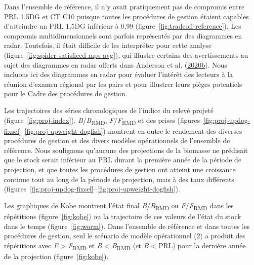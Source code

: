 \documentclass[11pt]{book}
\begin{document}
Dans l'ensemble de référence, il n'y avait pratiquement pas de compromis entre PRL 1,5DG et CT C10 puisque toutes les procédures de gestion étaient capables d'atteindre un PRL 1,5DG inférieur à 0,99 (figure~\ref{fig:tradeoff-reference}). Les compromis multidimensionnels sont parfois représentés par des diagrammes en radar. Toutefois, il était difficile de les interpréter pour cette analyse (figure~\ref{fig:spider-satisficed-mps-avg}), qui illustre certains des avertissements au sujet des diagrammes en radar offerts dans Anderson et al. (\protect\hyperlink{ref-anderson2020gfmp}{2020}\protect\hyperlink{ref-anderson2020gfmp}{b}). Nous incluons ici des diagrammes en radar pour évaluer l'intérêt des lecteurs à la réunion d'examen régional par les pairs et pour illustrer leurs pièges potentiels pour le Cadre des procédures de gestion.

Les trajectoires des séries chronologiques de l'indice du relevé projeté (figure~\ref{fig:proj-index}), \emph{B}/\emph{B}\textsubscript{RMD}, \emph{F}/\emph{F}\textsubscript{RMD} et des prises (figures~\ref{fig:proj-updog-fixsel}--\ref{fig:proj-upweight-dogfish}) montrent en outre le rendement des diverses procédures de gestion et des divers modèles opérationnels de l'ensemble de référence. Nous soulignons qu'aucune des projections de la biomasse ne prédisait que le stock serait inférieur au PRL durant la première année de la période de projection, et que toutes les procédures de gestion ont atteint une croissance continue tout au long de la période de projection, mais à des taux différents (figures~\ref{fig:proj-updog-fixsel}--\ref{fig:proj-upweight-dogfish}).

Les graphiques de Kobe montrent l'état final \emph{B}/\emph{B}\textsubscript{RMD} ou \emph{F}/\emph{F}\textsubscript{RMD} dans les répétitions (figure~\ref{fig:kobe}) ou la trajectoire de ces valeurs de l'état du stock dans le temps (figure~\ref{fig:worm}). Dans l'ensemble de référence et dans toutes les procédures de gestion, seul le scénario de modèle opérationnel (2) a produit des répétitions avec \emph{F} \textgreater{} \emph{F}\textsubscript{RMD} et \emph{B} \textless{} \emph{B}\textsubscript{RMD} (et \emph{B} \textless{} PRL) pour la dernière année de la projection (figure~\ref{fig:kobe}).
\end{document}
